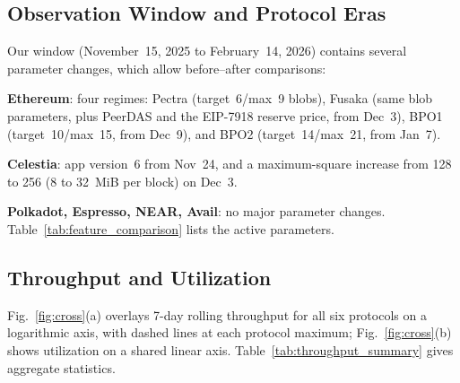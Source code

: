 
\subsection{Observation Window and Protocol Eras}
\label{sec:results-eras}

Our window (November~15, 2025 to February~14, 2026) contains several parameter changes, which allow before--after comparisons:
\squishlist
    \item \textbf{Ethereum}: four regimes: Pectra (target~6/max~9 blobs), Fusaka (same blob parameters, plus PeerDAS and the EIP-7918 reserve price, from Dec~3), BPO1 (target~10/max~15, from Dec~9), and BPO2 (target~14/max~21, from Jan~7).
    \item \textbf{Celestia}: app version~6 from Nov~24, and a maximum-square increase from 128 to 256 (8 to 32~MiB per block) on Dec~3.
    \item \textbf{Polkadot, Espresso, NEAR, Avail}: no major parameter changes.
\squishend
Table~\ref{tab:feature_comparison} lists the active parameters.

\subsection{Throughput and Utilization}
\label{sec:results-throughput}

Fig.~\ref{fig:cross}(a) overlays 7-day rolling throughput for all six protocols on a logarithmic axis, with dashed lines at each protocol maximum; Fig.~\ref{fig:cross}(b) shows utilization on a shared linear axis.
Table~\ref{tab:throughput_summary} gives aggregate statistics.

